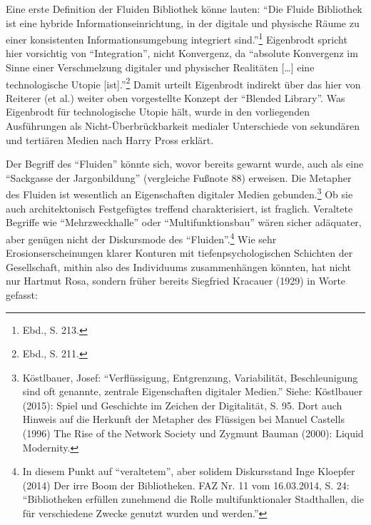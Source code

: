 \documentclass[a4paper,
fontsize=11pt,
oneside,
numbers=noperiodatend,
parskip=half-,
bibliography=totoc,
final
]{scrartcl}
\begin{document}
Eine erste Definition der Fluiden Bibliothek könne lauten: \enquote{Die
Fluide Bibliothek ist eine hybride Informationseinrichtung, in der
digitale und physische Räume zu einer konsistenten Informationsumgebung
integriert sind.}\footnote{Ebd., S. 213.} Eigenbrodt spricht hier
vorsichtig von \enquote{Integration}, nicht Konvergenz, da
\enquote{absolute Konvergenz im Sinne einer Verschmelzung digitaler und
physischer Realitäten {[}\ldots{}{]} eine technologische Utopie
{[}ist{]}.}\footnote{Ebd., S. 211.} Damit urteilt Eigenbrodt indirekt
über das hier von Reiterer (et al.) weiter oben vorgestellte Konzept der
\enquote{Blended Library}. Was Eigenbrodt für technologische Utopie
hält, wurde in den vorliegenden Ausführungen als Nicht-Überbrückbarkeit
medialer Unterschiede von sekundären und tertiären Medien nach Harry
Pross erklärt.

Der Begriff des \enquote{Fluiden} könnte sich, wovor bereits gewarnt
wurde, auch als eine \enquote{Sackgasse der Jargonbildung} (vergleiche
Fußnote 88) erweisen. Die Metapher des Fluiden ist wesentlich an
Eigenschaften digitaler Medien gebunden.\footnote{Köstlbauer, Josef:
  \enquote{Verflüssigung, Entgrenzung, Variabilität, Beschleunigung sind
  oft genannte, zentrale Eigenschaften digitaler Medien.} Siehe:
  Köstlbauer (2015): Spiel und Geschichte im Zeichen der Digitalität, S.
  95. Dort auch Hinweis auf die Herkunft der Metapher des Flüssigen bei
  Manuel Castells (1996) The Rise of the Network Society und Zygmunt
  Bauman (2000): Liquid Modernity.} Ob sie auch architektonisch
Festgefügtes treffend charakterisiert, ist fraglich. Veraltete Begriffe
wie \enquote{Mehrzweckhalle} oder \enquote{Multifunktionsbau} wären
sicher adäquater, aber genügen nicht der Diskursmode des
\enquote{Fluiden}.\footnote{In diesem Punkt auf \enquote{veraltetem},
  aber solidem Diskursstand Inge Kloepfer (2014) Der irre Boom der
  Bibliotheken. FAZ Nr. 11 vom 16.03.2014, S. 24: \enquote{Bibliotheken
  erfüllen zunehmend die Rolle multifunktionaler Stadthallen, die für
  verschiedene Zwecke genutzt wurden und werden.}} Wie sehr
Erosionserscheinungen klarer Konturen mit tiefenpsychologischen
Schichten der Gesellschaft, mithin also des Individuums zusammenhängen
könnten, hat nicht nur Hartmut Rosa, sondern früher bereits Siegfried
Kracauer (1929) in Worte gefasst:
\end{document}
